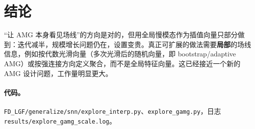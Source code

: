 \documentclass[11pt,a4paper]{ctexart}
\begin{document}
\section{结论}
“让 AMG 本身看见场线”的方向是对的，但用全局慢模态作为插值向量只部分做到：迭代减半，规模增长问题仍在，设置变贵。真正可扩展的做法需要\textbf{局部}的场线信息，例如按代数光滑向量（多次光滑后的随机向量，即 bootstrap/adaptive AMG）或按强连接方向定义聚合，而不是全局特征向量。这已经接近一个新的 AMG 设计问题，工作量明显更大。
\paragraph{代码。}\texttt{FD\_LGF/generalize/snn/explore\_interp.py}、\texttt{explore\_gamg.py}，日志 \texttt{results/explore\_gamg\_scale.log}。
\end{document}
